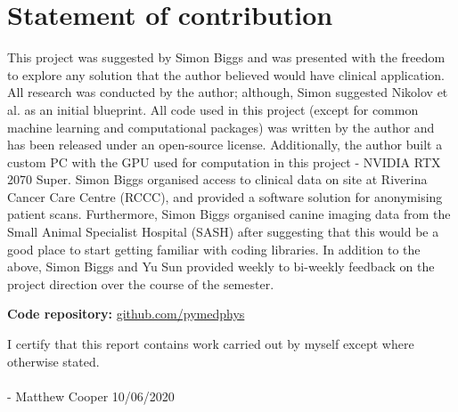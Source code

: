 \chapter{Statement of contribution}
\label{ch:contribution}

This project was suggested by Simon Biggs and was presented with the freedom to explore any solution that the author believed would have clinical application. All research was conducted by the author; although, Simon suggested Nikolov et al.  as an initial blueprint. All code used in this project (except for common machine learning and computational packages) was written by the author and has been released under an open-source license. Additionally, the author built a custom PC with the GPU used for computation in this project - NVIDIA RTX 2070 Super. Simon Biggs organised access to clinical data on site at Riverina Cancer Care Centre (RCCC), and provided a software solution for anonymising patient scans. Furthermore, Simon Biggs organised canine imaging data from the Small Animal Specialist Hospital (SASH) after suggesting that this would be a good place to start getting familiar with coding libraries. In addition to the above, Simon Biggs and Yu Sun provided weekly to bi-weekly feedback on the project direction over the course of the semester.


\textbf{Code repository:} \href{https://github.com/pymedphys/pymedphys}{github.com/pymedphys}


\vspace{1cm}
\vspace{1cm}

I certify that this report contains work carried out by myself except where otherwise
stated.
\\
\\
- Matthew Cooper     10/06/2020
\\
\\
